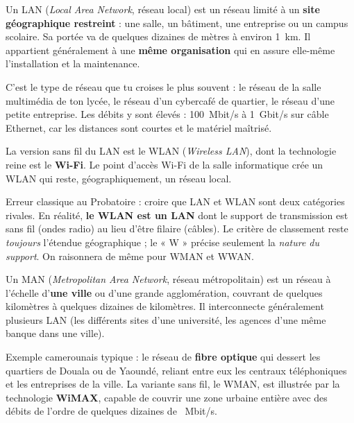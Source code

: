 \documentclass[11pt]{article}
\newcommand{\cle}[1]{{\popxbold\color{popdark}#1}}
\newcounter{popsec}
\newcounter{popsub}
\newcommand{\courssub}[1]{%
  \stepcounter{popsub}%
  \par\vspace{9pt}\noindent{\popxbold\fontsize{11.5}{13}\selectfont\color{popink}{\color{poporange}\thepopsec.\thepopsub}\hspace{6pt}#1}\par\nopagebreak\vspace{4pt}
}
\begin{document}
\begin{definition}
Un \cle{LAN} (\emph{Local Area Network}, réseau local) est un réseau limité à un \textbf{site géographique restreint} : une salle, un bâtiment, une entreprise ou un campus scolaire. Sa portée va de quelques dizaines de mètres à environ \SI{1}{km}. Il appartient généralement à une \textbf{même organisation} qui en assure elle-même l'installation et la maintenance.
\end{definition}

C'est le type de réseau que tu croises le plus souvent : le réseau de la salle multimédia de ton lycée, le réseau d'un cybercafé de quartier, le réseau d'une petite entreprise. Les débits y sont élevés : \SI{100}{Mbit/s} à \SI{1}{Gbit/s} sur câble Ethernet, car les distances sont courtes et le matériel maîtrisé.

La version sans fil du LAN est le \cle{WLAN} (\emph{Wireless LAN}), dont la technologie reine est le \textbf{Wi-Fi}. Le point d'accès Wi-Fi de la salle informatique crée un WLAN qui reste, géographiquement, un réseau local.

\begin{attention}
Erreur classique au Probatoire : croire que LAN et WLAN sont deux catégories rivales. En réalité, \textbf{le WLAN est un LAN} dont le support de transmission est sans fil (ondes radio) au lieu d'être filaire (câbles). Le critère de classement reste \emph{toujours} l'étendue géographique ; le « W » précise seulement la \emph{nature du support}. On raisonnera de même pour WMAN et WWAN.
\end{attention}

\courssub{Le MAN : le réseau métropolitain}

\begin{definition}
Un \cle{MAN} (\emph{Metropolitan Area Network}, réseau métropolitain) est un réseau à l'échelle d'\textbf{une ville} ou d'une grande agglomération, couvrant de quelques kilomètres à quelques dizaines de kilomètres. Il interconnecte généralement plusieurs LAN (les différents sites d'une université, les agences d'une même banque dans une ville).
\end{definition}

Exemple camerounais typique : le réseau de \textbf{fibre optique} qui dessert les quartiers de Douala ou de Yaoundé, reliant entre eux les centraux téléphoniques et les entreprises de la ville. La variante sans fil, le \cle{WMAN}, est illustrée par la technologie \textbf{WiMAX}, capable de couvrir une zone urbaine entière avec des débits de l'ordre de quelques dizaines de \SI{}{Mbit/s}.
\end{document}
